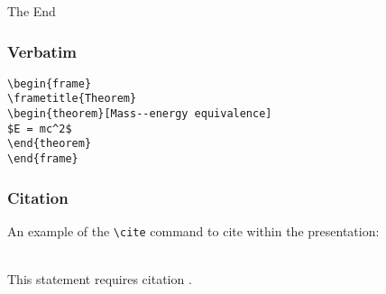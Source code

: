 \documentclass{beamer}
\begin{document}
\begin{frame}
\Huge{\centerline{The End}}
\end{frame}
\begin{frame}[fragile] %
\frametitle{Verbatim}
\begin{example}
\begin{verbatim}
\begin{frame}
\frametitle{Theorem}
\begin{theorem}[Mass--energy equivalence]
$E = mc^2$
\end{theorem}
\end{frame}\end{verbatim}
\end{example}
\end{frame}
\begin{frame}[fragile] %
\frametitle{Citation}
An example of the \verb|\cite| command to cite within the presentation:\\~

This statement requires citation \cite{p1}.
\end{frame}

\end{document}
